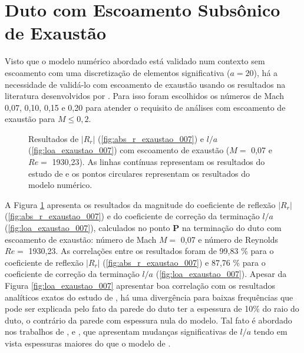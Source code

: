



\newpage
\section{Duto com Escoamento Subsônico de Exaustão}

Visto que o modelo numérico abordado está validado num contexto sem escoamento com uma discretização de elementos significativa ($a = 20$), há a necessidade de validá-lo com escoamento de exaustão usando os resultados na literatura desenvolvidos por . Para isso foram escolhidos os números de Mach 0,07, 0,10, 0,15 e 0,20 para atender o requisito de  análises com escoamento de exaustão para $M \leq 0,2$.

\begin{figure}[ht!]
\begin{subfigure}{\scaleA \textwidth}
  
\end{subfigure}%
\begin{subfigure}{\scaleA \textwidth}
  
\end{subfigure}
\caption[Resultados de $|R_{r}|$ e $l/a$ com escoamento de exaustão ($M =$ 0,07 e $Re =$ 1930,23)]{Resultados de $|R_{r}|$ (\ref{fig:abs_r_exaustao_007}) e $l/a$ (\ref{fig:loa_exaustao_007}) com escoamento de exaustão ($M =$ 0,07 e $Re =$ 1930,23). As linhas contínuas representam os resultados do estudo de  e os pontos circulares representam os resultados do modelo numérico.}
\label{fig:resultados_exaustao_007}
\end{figure}

A Figura \ref{fig:resultados_exaustao_007} apresenta os resultados da magnitude do coeficiente de reflexão $|R_{r}|$ (\ref{fig:abs_r_exaustao_007}) e do coeficiente de correção da terminação $l/a$ (\ref{fig:loa_exaustao_007}), calculados no ponto $\textbf{P}$ na terminação do duto com escoamento de exaustão: número de Mach $M =$ 0,07 e número de Reynolds $Re =$ 1930,23.  As correlações entre os resultados foram de 99,83 \% para o coeficiente de reflexão $|R_{r}|$ (\ref{fig:abs_r_exaustao_007}) e 87,76 \% para o coeficiente de correção da terminação $l/a$ (\ref{fig:loa_exaustao_007}). Apesar da Figura \ref{fig:loa_exaustao_007} apresentar boa correlação com os resultados analíticos exatos do estudo de , há uma divergência para baixas frequências que pode ser explicada pelo fato da parede do duto ter a espessura de 10\% do raio do duto, o contrário da parede com espessura nula do modelo. Tal fato é abordado nos trabalhos de ,  e , que apresentam mudanças significativas de $l/a$ tendo em vista espessuras maiores do que o modelo de .

